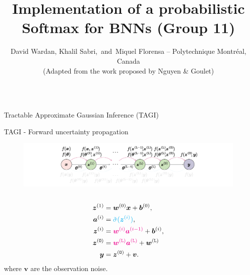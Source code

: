 \documentclass[final]{beamer}
\title{Implementation of a probabilistic Softmax for BNNs (Group 11)}
\author{  David Wardan, Khalil Sabri, \,and\, Miquel Florensa  -- Polytechnique Montr\'{e}al, Canada \\ \vspace{5mm} \Large (Adapted from the work proposed by Nguyen \& Goulet)}
\institute[shortinst]{}
\begin{document}
\begin{frame}[t]

\begin{columns}
\begin{column}[T]{.31\textwidth}

\begin{block}{Tractable Approximate Gaussian Inference (TAGI)}

\end{block}



\begin{block}{TAGI - Forward uncertainty propagation}
 \begin{figure}[h!]
 \centering
  \includegraphics[width=1\textwidth]{Figures/forward_pass.pdf}
 \end{figure}

 \begin{columns}
 \begin{column}{0.33\textwidth}
\begin{equation*} \label{eq:nn}
\begin{split}
\bm{z}^{(1)} &= \bm{w}^{(0)} \bm{x} + \bm{b}^{(0)}, \\
\bm{a}^{(i)} &= {\color{cyan}\tilde{\sigma}(\bm{z}^{(i)})}, \\
\bm{z}^{(i)} &= {\color{magenta}\bm{w}^{(i)} \bm{a}^{(i-1)}} + \bm{b}^{(i)}, \\
\bm{z}^{(\mathtt{O})} &=  {\color{magenta}\bm{w}^{(\mathtt{L})} \bm{a}^{(\mathtt{L})}} + \bm{w}^{(\mathtt{L})} \\
\bm{y} &=  \bm{z}^{(\mathtt{O})} + \bm{v}.
\end{split}
\end{equation*}
where $\bm{v}$ are the observation noise.
\end{column}


\end{columns}
\end{block}
\end{column}
\end{columns}
\end{frame}
\end{document}
